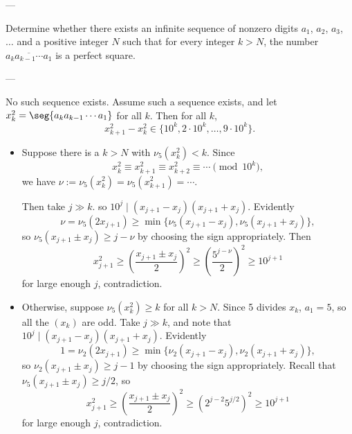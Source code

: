 
---

Determine whether there exists an infinite sequence of nonzero digits $a_1$, $a_2$, $a_3$, $\ldots$ and a positive integer $N$ such that for every integer $k>N$, the number $\overline{a_ka_{k-1}\cdots a_1}$ is a perfect square.

---

No such sequence exists. Assume such a sequence exists, and let $x_k^2=\seg{a_ka_{k-1}\cdots a_1}$ for all $k$. Then for all $k$,
\[x_{k+1}^2-x_k^2\in\{10^k,2\cdot10^k,\ldots,9\cdot10^k\}.\]
\begin{itemize}
    \item Suppose there is a $k>N$ with $\nu_5(x_k^2)<k$. Since
        \[x_k^2\equiv x_{k+1}^2\equiv x_{k+2}^2\equiv\cdots\pmod{10^k},\]
        we have $\nu:=\nu_5(x_k^2)=\nu_5(x_{k+1}^2)=\cdots$.

        Then take $j\gg k$. so $10^j\mid(x_{j+1}-x_j)(x_{j+1}+x_j)$. Evidently
        \[\nu=\nu_5(2x_{j+1})\ge\min\big\{\nu_5(x_{j+1}-x_j),\nu_5(x_{j+1}+x_j)\big\},\]
        so $\nu_5(x_{j+1}\pm x_j)\ge j-\nu$ by choosing the sign appropriately. Then
        \[x_{j+1}^2\ge\left(\frac{x_{j+1}\pm x_j}2\right)^2\ge\left(\frac{5^{j-\nu}}2\right)^2\ge10^{j+1}\]
        for large enough $j$, contradiction.

    \item Otherwise, suppose $\nu_5(x_k^2)\ge k$ for all $k>N$. Since 5 divides $x_k$, $a_1=5$, so all the $(x_k)$ are odd. Take $j\gg k$, and note that $10^j\mid(x_{j+1}-x_j)(x_{j+1}+x_j)$. Evidently
        \[1=\nu_2(2x_{j+1})\ge\min\big\{\nu_2(x_{j+1}-x_j),\nu_2(x_{j+1}+x_j)\},\]
        so $\nu_2(x_{j+1}\pm x_j)\ge j-1$ by choosing the sign appropriately. Recall that $\nu_5(x_{j+1}\pm x_j)\ge j/2$, so
        \[x_{j+1}^2\ge\left(\frac{x_{j+1}\pm x_j}2\right)^2\ge\left(2^{j-2}5^{j/2}\right)^2\ge10^{j+1}\]
        for large enough $j$, contradiction.
\end{itemize}
